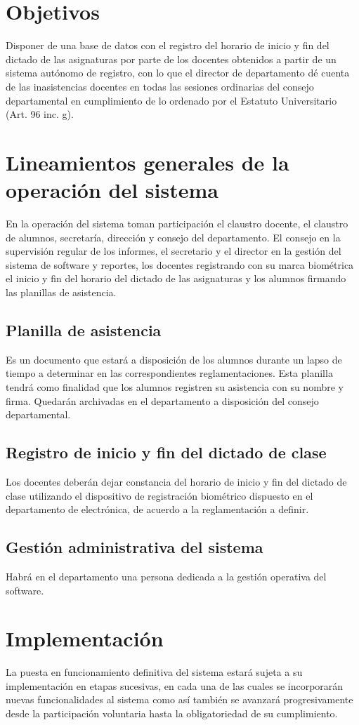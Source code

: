\documentclass[a4paper, 11pt]{article} %
\begin{document}
\section*{Objetivos}
Disponer de una base de datos con el registro del horario de inicio y fin del dictado de las asignaturas por parte de los docentes obtenidos a partir de un sistema autónomo de registro, con lo que el director de departamento dé cuenta de las inasistencias docentes en todas las sesiones ordinarias del consejo departamental en cumplimiento de lo ordenado por el Estatuto Universitario (Art. 96 inc. g). 
\section*{Lineamientos generales de la operación del sistema}
En la operación del sistema toman participación el claustro docente, el claustro de alumnos, secretaría, dirección y consejo del departamento. El consejo en la supervisión regular de los informes, el secretario y el director en la gestión del sistema de software y reportes, los docentes registrando con su marca biométrica el inicio y fin del horario del dictado de las asignaturas y los alumnos firmando las planillas de asistencia.
\subsection*{Planilla de asistencia}
Es un documento que estará a disposición de los alumnos durante un lapso de tiempo a determinar en las correspondientes reglamentaciones. Esta planilla tendrá como finalidad que los alumnos registren su asistencia con su nombre y firma. Quedarán archivadas en el departamento a disposición del consejo departamental.
\subsection*{Registro de inicio y fin del dictado de clase}
Los docentes deberán dejar constancia del horario de inicio y fin del dictado de clase utilizando el dispositivo de registración biométrico dispuesto en el departamento de electrónica, de acuerdo a la reglamentación a definir.\\
\subsection*{Gestión administrativa del sistema}
Habrá en el departamento una persona dedicada a la gestión operativa del software.
\section*{Implementación}
La puesta en funcionamiento definitiva del sistema estará sujeta a su implementación en etapas sucesivas, en cada una de las cuales se incorporarán nuevas funcionalidades al sistema como así también se avanzará progresivamente desde la participación voluntaria hasta la obligatoriedad de su cumplimiento.\\
\end{document}
